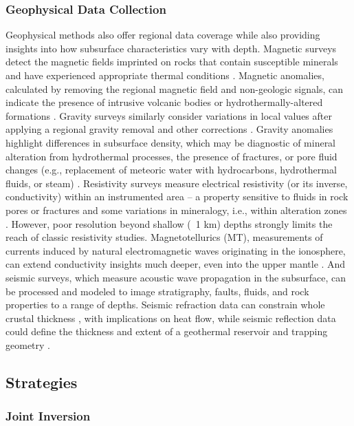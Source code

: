 \subsubsection{Geophysical Data Collection}
Geophysical methods also offer regional data coverage while also providing insights into how subsurface characteristics vary with depth. Magnetic surveys detect the magnetic fields imprinted on rocks that contain susceptible minerals and have experienced appropriate thermal conditions \citep[~p. 248-249]{lowrie_fundamentals_2007}. Magnetic anomalies, calculated by removing the regional magnetic field and non-geologic signals, can indicate the presence of intrusive volcanic bodies or hydrothermally-altered formations \citep[~p. 146]{glassley_geothermal_2015}. Gravity surveys similarly consider variations in local values after applying a regional gravity removal and other corrections \citep[~p. 59-62]{lowrie_fundamentals_2007}. Gravity anomalies highlight differences in subsurface density, which may be diagnostic of mineral alteration from hydrothermal processes, the presence of fractures, or pore fluid changes (e.g., replacement of meteoric water with hydrocarbons, hydrothermal fluids, or steam) \citep[~p. 150]{glassley_geothermal_2015}. Resistivity surveys measure electrical resistivity (or its inverse, conductivity) within an instrumented area – a property sensitive to fluids in rock pores or fractures and some variations in mineralogy, i.e., within alteration zones \citep[~p. 147]{glassley_geothermal_2015}. However, poor resolution beyond shallow (~1 km) depths strongly limits the reach of classic resistivity studies. Magnetotellurics (MT), measurements of currents induced by natural electromagnetic waves originating in the ionosphere, can extend conductivity insights much deeper, even into the upper mantle \citep[~p. 225]{lowrie_fundamentals_2007}. And seismic surveys, which measure acoustic wave propagation in the subsurface, can be processed and modeled to image stratigraphy, faults, fluids, and rock properties to a range of depths. Seismic refraction data can constrain whole crustal thickness \citep[e.g.][]{holmes_oceanic_2009}, with implications on heat flow, while seismic reflection data could define the thickness and extent of a geothermal reservoir and trapping geometry \citep[e.g.][]{cappetti_new_2005}.

\subsection{Strategies}
\subsubsection{Joint Inversion}

